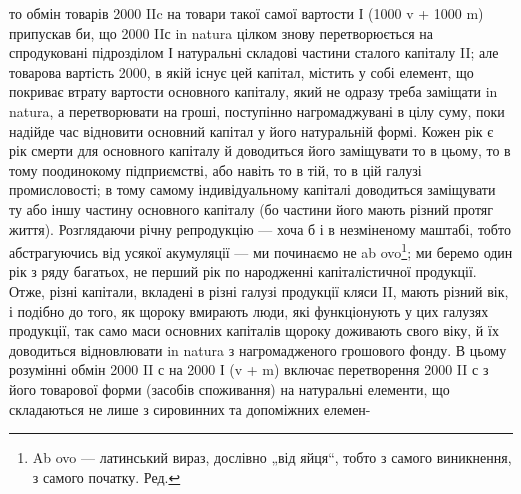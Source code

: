 то обмін товарів 2000 IIc на товари такої самої вартости І (1000 v +
1000 m) припускав би, що 2000 IIс in natura цілком знову перетворюється
на спродуковані підрозділом І натуральні складові частини сталого
капіталу II; але товарова вартість 2000, в якій існує цей капітал,
містить у собі елемент, що покриває втрату вартости основного капіталу,
який не одразу треба заміщати in natura, а перетворювати на гроші, поступінно
нагромаджувані в цілу суму, поки надійде час відновити
основний капітал у його натуральній формі. Кожен рік є рік смерти для
основного капіталу й доводиться його заміщувати то в цьому, то в тому
поодинокому підприємстві, або навіть то в тій, то в цій галузі промисловості;
в тому самому індивідуальному капіталі доводиться заміщувати
ту або іншу частину основного капіталу (бо частини його мають різний
протяг життя). Розглядаючи річну репродукцію — хоча б і в незміненому
маштабі, тобто абстрагуючись від усякої акумуляції — ми починаємо не
ab ovo\footnote*{
Ab ovo — латинський вираз, дослівно „від яйця“, тобто з самого виникнення,
з самого початку. Ред.
}; ми беремо один рік з ряду багатьох, не перший рік по
народженні капіталістичної продукції. Отже, різні капітали, вкладені
в різні галузі продукції кляси II, мають різний вік, і подібно до того,
як щороку вмирають люди, які функціонують у цих галузях продукції,
так само маси основних капіталів щороку доживають свого віку, й їх доводиться
відновлювати in natura з нагромадженого грошового фонду. В
цьому розумінні обмін 2000 II с на 2000 І (v + m) включає перетворення
2000 II с з його товарової форми (засобів споживання) на натуральні
елементи, що складаються не лише з сировинних та допоміжних елемен-
\parbreak{}  %
